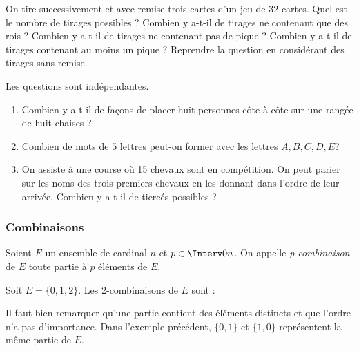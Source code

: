 \documentclass[a4paper,10pt]{report}
\begin{document}
\begin{Exemple}
On tire successivement et avec remise trois cartes d'un jeu de 32 cartes. Quel est le nombre de tirages possibles ? Combien y a-t-il de tirages ne contenant que des rois ? Combien y a-t-il de tirages ne contenant pas de pique ? Combien y a-t-il de tirages contenant au moins un pique ? Reprendre la question en considérant des tirages sans remise.

\vspace{9cm}
\end{Exemple}



\begin{ApplicationDirecte} Les questions sont indépendantes.
\begin{enumerate}
\item Combien y a t-il de façons de placer huit personnes côte à côte sur une rangée de huit chaises ?
\item Combien de mots de $5$ lettres peut-on former avec les lettres $A,B,C,D,E$?
\item On assiste à une course où 15 chevaux sont en compétition. On peut parier sur les noms des trois premiers chevaux en les donnant dans l'ordre de leur arrivée. Combien y a-t-il de tiercés possibles ?
\end{enumerate}
\end{ApplicationDirecte}

\subsubsection{Combinaisons}

\begin{Definition}{}
Soient $E$ un ensemble de cardinal $n$ et $p \in \Interv 0n$. On appelle \emph{p-combinaison} de $E$ toute partie à $p$ éléments de $E$.
\end{Definition}

\medskip

\begin{Exemple}
Soit $E= \lbrace 0,1,2 \rbrace$. Les 2-combinaisons de $E$ sont : 
\end{Exemple}

\medskip

\begin{att}
Il faut bien remarquer qu'une partie contient des éléments distincts et que l'ordre n'a pas d'importance. Dans l'exemple précédent, $\lbrace 0,1 \rbrace$ et $ \lbrace1,0 \rbrace$ représentent la même partie de $E$.
\end{att}
\end{document}
